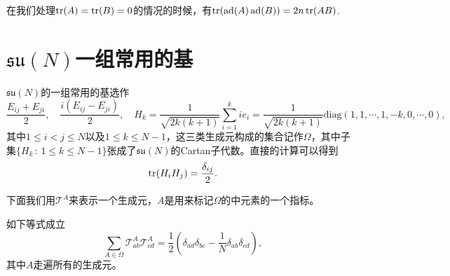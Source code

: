 \documentclass[10pt]{article}
\DeclareMathOperator{\ad}{ad}
\begin{document}
在我们处理$\operatorname{tr}(A)=\operatorname{tr}(B)=0$的情况的时候，有$\tr(\ad(A)\ad(B))=2n \tr(AB)$. 

\clearpage
\section{$\mathfrak{su}(N)$一组常用的基}

$\mathfrak{su}(N)$的一组常用的基选作
\[
	\frac{E_{ij}+E_{ji}}{2},\quad \frac{i(E_{ij}-E_{ji})}{2},\quad H_k=\frac{1}{\sqrt{2k(k+1)}}\sum_{i=1}^{k} ie_{i}=\frac{1}{\sqrt{2k(k+1)}}
	\mathrm{diag}(1,1,\cdots,1,-k,0,\cdots,0),
\]
其中$1\leq i<j\leq N$以及$1\leq k \leq N-1$，这三类生成元构成的集合记作$\Omega$，其中子集$\{H_k\,:\,1\leq k \leq N-1\}$张成了$\mathfrak{su}(N)$的Cartan子代数。直接的计算可以得到
\[
	\operatorname{tr}(H_iH_j)=\frac{\delta_{ij}}{2}.
\]

下面我们用$\mathcal{T}^A$来表示一个生成元，$A$是用来标记$\Omega$的中元素的一个指标。

\pro 如下等式成立
\[
	\sum_{A\in \Omega}\mathcal{T}^A_{ab}\mathcal{T}^A_{cd}=\frac{1}{2}\left(\delta_{ad}\delta_{bc}-\frac{1}{N}\delta_{ab}\delta_{cd}\right),
\]
其中$A$走遍所有的生成元。
\end{document}
